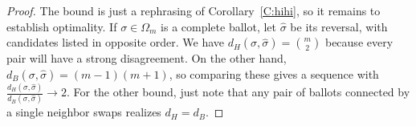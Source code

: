 \documentclass[10pt,a4paper]{amsart}
\begin{document}
\begin{proof}
The bound is just a rephrasing of Corollary~\ref{C:hihi}, so it remains to establish optimality.
If $\sigma\in\Omega_m$ is a complete ballot, let 
$\hat\sigma$ be its reversal, with candidates listed in opposite order.  We have $d_H(\sigma,\hat\sigma)=\binom{m}{2}$ because every pair will have a strong disagreement.  
On the other hand, $d_B(\sigma,\hat\sigma)= (m-1)(m+1)$, so comparing these gives a sequence with 
$\displaystyle\frac{d_H(\sigma,\hat\sigma)}{d_B(\sigma,\hat\sigma)}
\to 2$.  For the other bound, just note that any pair of ballots connected by a single neighbor swaps realizes $d_H=d_B$.
\end{proof}
\end{document}

